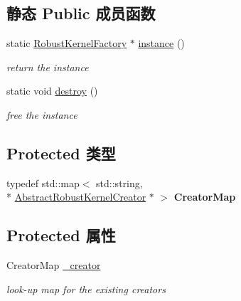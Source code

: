 \subsection*{静态 Public 成员函数}
\begin{DoxyCompactItemize}
\item 
\hypertarget{classg2o_1_1RobustKernelFactory_a9cc4361620f8d7269ad9774d3aba2fc0}{static \hyperlink{classg2o_1_1RobustKernelFactory}{Robust\-Kernel\-Factory} $\ast$ \hyperlink{classg2o_1_1RobustKernelFactory_a9cc4361620f8d7269ad9774d3aba2fc0}{instance} ()}\label{classg2o_1_1RobustKernelFactory_a9cc4361620f8d7269ad9774d3aba2fc0}

\begin{DoxyCompactList}\small\item\em return the instance \end{DoxyCompactList}\item 
\hypertarget{classg2o_1_1RobustKernelFactory_a6c96f77eb4a14e5e8f5b46eb734c0393}{static void \hyperlink{classg2o_1_1RobustKernelFactory_a6c96f77eb4a14e5e8f5b46eb734c0393}{destroy} ()}\label{classg2o_1_1RobustKernelFactory_a6c96f77eb4a14e5e8f5b46eb734c0393}

\begin{DoxyCompactList}\small\item\em free the instance \end{DoxyCompactList}\end{DoxyCompactItemize}
\subsection*{Protected 类型}
\begin{DoxyCompactItemize}
\item 
\hypertarget{classg2o_1_1RobustKernelFactory_aa143765542cbf4738e2137d61517b218}{typedef std\-::map$<$ std\-::string, \\*
\hyperlink{classg2o_1_1AbstractRobustKernelCreator}{Abstract\-Robust\-Kernel\-Creator} $\ast$ $>$ {\bfseries Creator\-Map}}\label{classg2o_1_1RobustKernelFactory_aa143765542cbf4738e2137d61517b218}

\end{DoxyCompactItemize}
\subsection*{Protected 属性}
\begin{DoxyCompactItemize}
\item 
\hypertarget{classg2o_1_1RobustKernelFactory_af5f3cea409d3f18baa40da898d21424b}{Creator\-Map \hyperlink{classg2o_1_1RobustKernelFactory_af5f3cea409d3f18baa40da898d21424b}{\-\_\-creator}}\label{classg2o_1_1RobustKernelFactory_af5f3cea409d3f18baa40da898d21424b}

\begin{DoxyCompactList}\small\item\em look-\/up map for the existing creators \end{DoxyCompactList}\end{DoxyCompactItemize}


